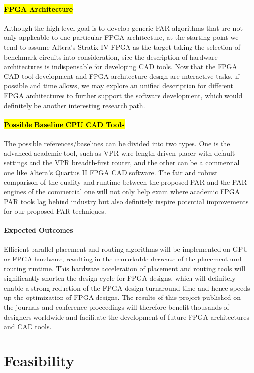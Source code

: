 \documentclass[a4paper,oneside,12pt]{article}
\begin{document}
\paragraph{\hl{FPGA Architecture}}
Although the high-level goal is to develop generic PAR algorithms that are not only applicable to one particular FPGA architecture, at the starting point we tend to assume Altera's Stratix IV FPGA as the target taking the selection of benchmark circuits into consideration, sice the description of hardware architectures is indispensable for developing CAD tools. Now that the FPGA CAD tool development and FPGA architecture design are interactive tasks, if possible and time allows, we may explore an unified description for different FPGA architectures to further support the software development, which would definitely be another interesting research path.

\paragraph{\hl{Possible Baseline CPU CAD Tools}}
The possible references/baselines can be divided into two types. One is the advanced academic tool, such as VPR wire-length driven placer with default settings and the VPR breadth-first router, and the other can be a commercial one like Altera's Quartus II FPGA CAD software.
The fair and robust comparison of the quality and runtime between the proposed PAR and the PAR engines of the commercial one will not only help exam where academic FPGA PAR tools lag behind industry but also definitely inspire potential improvements for our proposed PAR techniques.

\paragraph{Expected Outcomes}
Efficient parallel placement and routing algorithms will be implemented on GPU or FPGA hardware, resulting in the remarkable decrease of the placement and routing runtime. This hardware acceleration of placement and routing tools will significantly shorten the design cycle for FPGA designs, which will definitely enable a strong reduction of the FPGA design turnaround time and hence speeds up the optimization of FPGA designs. The results of this project published on the journals and conference proceedings will therefore benefit thousands of designers worldwide and facilitate the development of future FPGA architectures and CAD tools.

\section{Feasibility}
\end{document}
